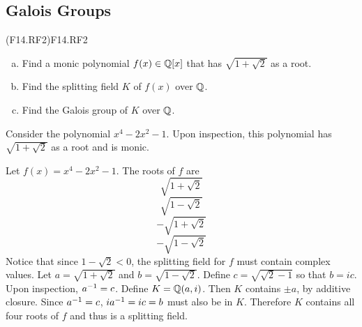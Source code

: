 \documentclass[../../AlgebraQualSolutions.tex]{subfiles}
\begin{document}
\subsection{Galois Groups}

\begin{prob}{(F14.RF2)}{F14.RF2}
	\begin{enumerate}[(a)]
		\item Find a monic polynomial $f(x) \in \mathbb{Q}[x]$ that has $\sqrt{1 + \sqrt2}$ as a root.
		\item Find the splitting field $K$ of $f(x)$ over $\mathbb{Q}$.
		\item Find the Galois group of $K$ over $\mathbb{Q}$.
	\end{enumerate}
\end{prob}

\begin{solution}
	Consider the polynomial $x^4 - 2x^2 - 1$. Upon inspection, this polynomial has $\sqrt{1 + \sqrt2}$ as a root and is monic.
\end{solution}

\begin{solution}
	Let $f(x) = x^4 - 2x^2 - 1$. The roots of $f$ are
		\[\sqrt{1 + \sqrt2}\]
		\[\sqrt{1 - \sqrt2}\]
		\[-\sqrt{1 + \sqrt2}\]
		\[-\sqrt{1 - \sqrt2}\]
	Notice that since $1 - \sqrt2<0$, the splitting field for $f$ must contain complex values. Let $a = \sqrt{1 + \sqrt2}$ and $b = \sqrt{1 - \sqrt2}$. Define $c = \sqrt{\sqrt2 - 1}$ so that $b = ic$. Upon inspection, $a^{-1} = c$. Define $K = \mathbb{Q}(a, i)$. Then $K$ contains $\pm a$, by additive closure. Since $a^{-1} = c$, $i a^{-1} = ic = b$ must also be in $K$. Therefore $K$ contains all four roots of $f$ and thus is a splitting field.
\end{solution}
\end{document}
